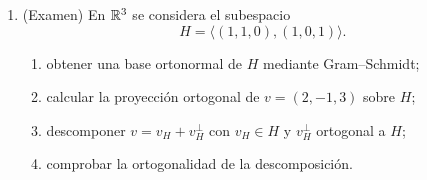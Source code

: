 \begin{enumerate}[label=\textbf{\arabic*.},leftmargin=*]
\item (Examen) En $\mathbb{R}^3$ se considera el subespacio
\[
H=\langle(1,1,0),(1,0,1)\rangle.
\]
\begin{enumerate}[label=\alph*)]
\item obtener una base ortonormal de $H$ mediante Gram--Schmidt;
\item calcular la proyección ortogonal de $v=(2,-1,3)$ sobre $H$;
\item descomponer $v=v_H+v_H^{\perp}$ con $v_H\in H$ y $v_H^{\perp}$ ortogonal a $H$;
\item comprobar la ortogonalidad de la descomposición.
\end{enumerate}

\end{enumerate}

